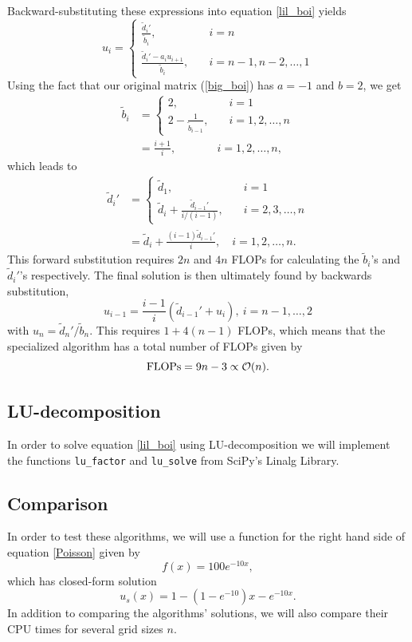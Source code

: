 \documentclass[notitlepage, reprint, nofootinbib]{revtex4-1}
\begin{document}
Backward-substituting these expressions into equation {\ref{lil_boi}} yields
\begin{equation}\label{general_u_ein}u_i=\begin{cases}\frac{\tilde{d}_i'}{\tilde{b}_i},\quad&i=n\\ \frac{\tilde{d}_i'-a_i u_{i+1}}{\tilde{b}_i},\quad&i=n-1,n-2,\dots,1\end{cases}\end{equation}
Using the fact that our original matrix (\ref{big_boi}) has $a=-1$ and $b=2$, we get
\begin{align}
	\tilde{b}_i &= \begin{cases}2,\quad&i=1\\2-\frac{1}{\tilde{b}_{i-1}},\quad&i=1,2,\dots,n\end{cases}\nonumber\\
	&=\frac{i+1}{i},\quad \quad \quad \ \ \ i=1,2,\dots, n,\label{algo2b}
\end{align}
which leads to
\begin{align}
	\tilde{d}_i'&=\begin{cases}\tilde{d}_1,\quad &i=1\\\tilde{d}_i+\frac{\tilde{d}_{i-1}'}{i/(i-1)},\quad&i=2,3,\dots, n\end{cases}\nonumber\\
	&=\tilde{d}_i+\frac{(i-1)\tilde{d}_{i-1}'}{i},\quad i=1,2,\dots,n.\label{algo2f}
\end{align}
This forward substitution requires $2n$ and $4n$ FLOPs for calculating the $\tilde{b}_i$'s and $\tilde{d}_i'$'s respectively. The final solution is then ultimately found by backwards substitution,
\begin{equation}\label{algo2u}u_{i-1}=\frac{i-1}{i}(\tilde{d}_{i-1}'+u_i),\ i=n-1,\dots,2\end{equation}
with $u_n=\tilde{d}_n'/\tilde{b}_n$. This requires $1 + 4(n-1)$ FLOPs, which means that the specialized algorithm has a total number of FLOPs given by 
\begin{equation}\label{FLOPS_special} \text{FLOPs}=9n-3\propto \order{n}.\end{equation}
\subsection{LU-decomposition}
In order to solve equation \ref{lil_boi} using LU-decomposition we will implement the functions \texttt{lu\_factor} and \texttt{lu\_solve} from SciPy's Linalg Library\cite{SciPy_linalg}. 
\subsection{Comparison}
In order to test these algorithms, we will use a function for the right hand side of equation \ref{Poisson} given by
\begin{equation}\label{test_func}f(x)= 100e^{-10x},\end{equation}
which has closed-form solution 
\begin{equation}\label{test_func_sol}u_s(x)=1-(1-e^{-10})x-e^{-10x}.\end{equation}
In addition to comparing the algorithms' solutions, we will also compare their CPU times for several grid sizes $n$. 
\end{document}
